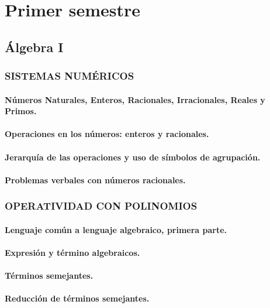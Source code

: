 \part{Primer semestre}
\chapter{Álgebra I}


\section{SISTEMAS NUMÉRICOS}%
\subsection{Números Naturales, Enteros, Racionales, Irracionales, Reales y Primos.}
\subsection{Operaciones en los números: enteros y racionales.}
\subsection{Jerarquía de las operaciones y uso de símbolos de agrupación.}
\subsection{Problemas verbales con números racionales.}








\section{OPERATIVIDAD CON POLINOMIOS} %
\subsection{Lenguaje común a lenguaje algebraico, primera parte.}
\subsection{Expresión y término algebraicos.}
\subsection{Términos semejantes.}
\subsection{Reducción de términos semejantes.}

